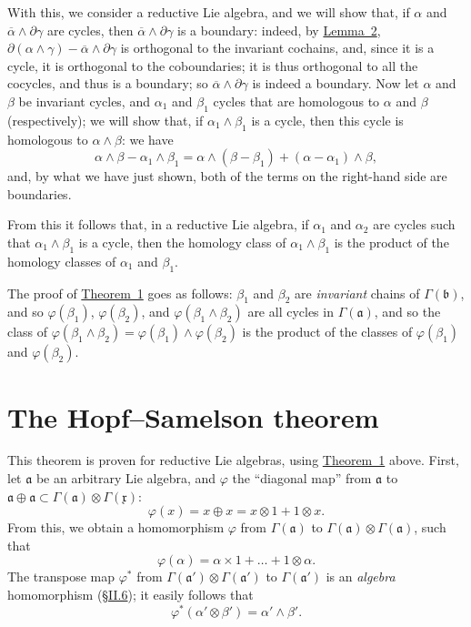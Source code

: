 \documentclass{article}
\newcommand{\fk}{\mathfrak}
\newcommand{\oldpage}[1]{\marginpar{\footnotesize$\Big\vert$ \textit{p.~#1}}}
\begin{document}
With this, we consider a reductive Lie algebra, and we will show that, if $\alpha$ and
\oldpage{50}
$\overline{\alpha}\wedge\partial\gamma$ are cycles, then $\overline{\alpha}\wedge\partial\gamma$ is a boundary:
indeed, by \hyperref[lemma2]{Lemma~2},
$\partial(\alpha\wedge\gamma)-\overline{\alpha}\wedge\partial\gamma$ is orthogonal to the invariant cochains, and, since it is a cycle, it is orthogonal to the coboundaries;
it is thus orthogonal to all the cocycles, and thus is a boundary;
so $\overline{\alpha}\wedge\partial\gamma$ is indeed a boundary.
Now let $\alpha$ and $\beta$ be invariant cycles, and $\alpha_1$ and $\beta_1$ cycles that are homologous to $\alpha$ and $\beta$ (respectively);
we will show that, if $\alpha_1\wedge\beta_1$ is a cycle, then this cycle is homologous to $\alpha\wedge\beta$:
we have
\[
  \alpha\wedge\beta - \alpha_1\wedge\beta_1
  = \alpha\wedge(\beta-\beta_1) + (\alpha-\alpha_1)\wedge\beta,
\]
and, by what we have just shown, both of the terms on the right-hand side are boundaries.

From this it follows that, in a reductive Lie algebra, if $\alpha_1$ and $\alpha_2$ are cycles such that $\alpha_1\wedge\beta_1$ is a cycle, then the homology class of $\alpha_1\wedge\beta_1$ is the product of the homology classes of $\alpha_1$ and $\beta_1$.

The proof of \hyperref[theorem1]{Theorem~1} goes as follows:
$\beta_1$ and $\beta_2$ are \emph{invariant} chains of $\Gamma(\fk{b})$, and so $\varphi(\beta_1)$, $\varphi(\beta_2)$, and $\varphi(\beta_1\wedge\beta_2)$ are all cycles in $\Gamma(\fk{a})$, and so the class of $\varphi(\beta_1\wedge\beta_2)=\varphi(\beta_1)\wedge\varphi(\beta_2)$ is the product of the classes of $\varphi(\beta_1)$ and $\varphi(\beta_2)$.


\section{The Hopf--Samelson theorem}
\label{II.7}

This theorem is proven for reductive Lie algebras, using \hyperref[theorem1]{Theorem~1} above.
First, let $\fk{a}$ be an arbitrary Lie algebra, and $\varphi$ the ``diagonal map'' from $\fk{a}$ to $\fk{a}\oplus\fk{a}\subset\Gamma(\fk{a})\otimes\Gamma(\fk{x})$:
\[
  \varphi(x) = x\oplus x = x\otimes1 + 1\otimes x.
\]
From this, we obtain a homomorphism $\varphi$ from $\Gamma(\fk{a})$ to $\Gamma(\fk{a})\otimes\Gamma(\fk{a})$, such that
\[
  \varphi(\alpha) = \alpha\times1 + \ldots + 1\otimes\alpha.
\]
The transpose map $\varphi^*$ from $\Gamma(\fk{a}')\otimes\Gamma(\fk{a}')$ to $\Gamma(\fk{a}')$ is an \emph{algebra} homomorphism (\hyperref[II.6]{\S II.6});
it easily follows that
\[
  \varphi^*(\alpha'\otimes\beta') = \alpha'\wedge\beta'.
\]
\end{document}
